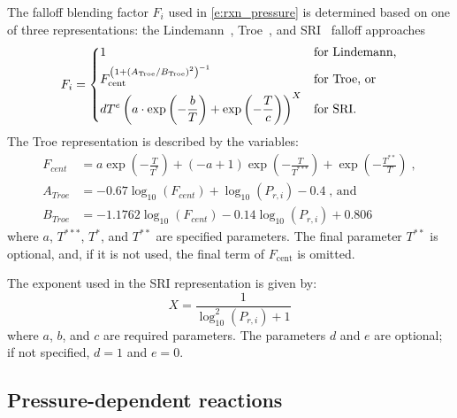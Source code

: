 \documentclass[12pt]{article}
\begin{document}
The falloff blending factor $F_i$ used in \cref{e:rxn_pressure} is determined based on one of three representations: the Lindemann~\cite{Lindemann:1922cz}, Troe~\cite{Gilbert:1983bb}, and SRI~\cite{Stewart:1989gj} falloff approaches
\begin{equation}
F_i = \begin{dcases}
1 &\text{for Lindemann,} \\
F_{\text{cent}}^{ \left( 1 + ( A_{\text{Troe}} / B_{\text{Troe}} )^2 \right)^{-1} } &\text{for Troe, or} \\
d T^e \left( a \cdot \exp \left( -\frac{b}{T} \right) + \exp \left( -\frac{T}{c} \right) \right)^X &\text{for SRI.}
\end{dcases}
\end{equation}
The Troe representation is described by the variables:
\begin{align}
 F_{cent} &= a \operatorname{exp}\left({- \frac{T}{T^{*}}}\right) + \left(- a + 1\right) \operatorname{exp}\left({- \frac{T}{T^{***}}}\right) + \operatorname{exp}\left({- \frac{T^{**}}{T}}\right) \;, \\
 A_{Troe} &= - 0.67 \log_{10}{\left (F_{cent} \right )} + \log_{10}{\left (P_{r, i} \right )} - 0.4 \;\text{, and}\\
 B_{Troe} &= - 1.1762 \log_{10}{\left (F_{cent} \right )} - 0.14 \log_{10}{\left (P_{r, i} \right )} + 0.806
\end{align}
where $a$, $T^{***}$, $T^*$, and $T^{**}$ are specified parameters.
The final parameter $T^{**}$ is optional, and, if it is not used, the final term of $F_{\text{cent}}$ is omitted.

The exponent used in the SRI representation is given by:
\begin{equation}
 X = \frac{1}{\log_{10}^{2}{\left (P_{r, i} \right )} + 1}
\end{equation}
where $a$, $b$, and $c$ are required parameters.
The parameters $d$ and $e$ are optional; if not specified, $d = 1$ and $e = 0$.

\subsection{Pressure-dependent reactions}
\end{document}

